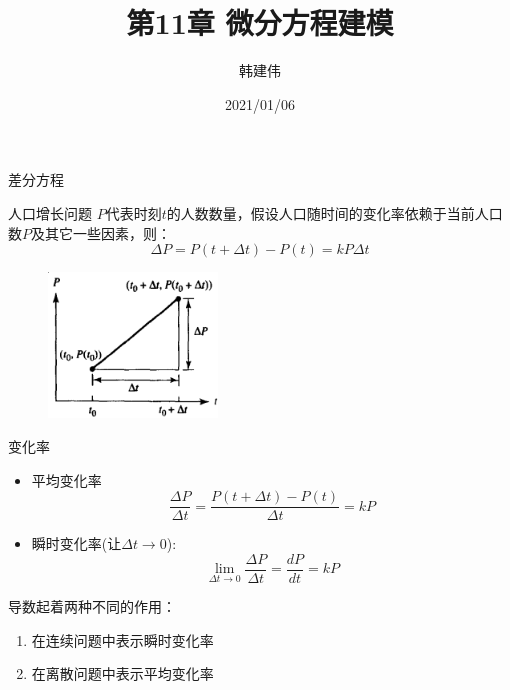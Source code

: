 \documentclass[UTF8]{ctexbeamer}
\title{第11章 微分方程建模}
\author{韩建伟}
\institute{
  信息学院\\
  \texttt{hanjianwei@zjgsu.edu.cn}
}
\date{2021/01/06}
\begin{document}
\begin{frame}[plain]
  \titlepage{}
\end{frame}

\begin{frame}{差分方程}
  
  \begin{block}{人口增长问题}
    $P$代表时刻$t$的人数数量，假设人口随时间的变化率依赖于当前人口数$P$及其它一些因素，则：
    \[
    \Delta P = P(t+\Delta t) - P(t) = kP\Delta t
    \]
  \end{block}

  \begin{figure}
    \centering
    \includegraphics[width=0.4\textwidth]{diff.png}
  \end{figure}
  
\end{frame}

\begin{frame}{变化率}
  \begin{itemize}
  \item 平均变化率
    \[
    \frac{\Delta P}{\Delta t} = \frac{P(t+\Delta t) - P(t)}{\Delta t} = kP
    \]
  \item 瞬时变化率(让$\Delta t \rightarrow 0$):
    \[
    \lim_{\Delta t \rightarrow 0} \frac{\Delta P}{\Delta t} =\frac{d P}{d t} =kP
    \]
  \end{itemize}

  导数起着两种不同的作用：

  \begin{enumerate}
  \item 在连续问题中表示瞬时变化率
  \item 在离散问题中表示平均变化率
  \end{enumerate}

\end{frame}
\end{document}
